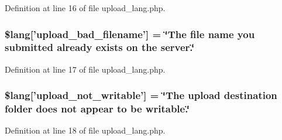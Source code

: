 Definition at line 16 of file upload\-\_\-lang.\-php.

\subsubsection[{\$lang}]{\setlength{\rightskip}{0pt plus 5cm}\$lang['upload\-\_\-bad\-\_\-filename'] = \char`\"{}The file name you submitted already exists on the server.\char`\"{}}\label{upload__lang_8php_abb379322384f3f35952a539c63e2c8f7}


Definition at line 17 of file upload\-\_\-lang.\-php.

\subsubsection[{\$lang}]{\setlength{\rightskip}{0pt plus 5cm}\$lang['upload\-\_\-not\-\_\-writable'] = \char`\"{}The upload destination folder does {\bf not} appear {\bf to} be writable.\char`\"{}}\label{upload__lang_8php_aed6bfb5a9094179427f61fcbb582145b}


Definition at line 18 of file upload\-\_\-lang.\-php.

